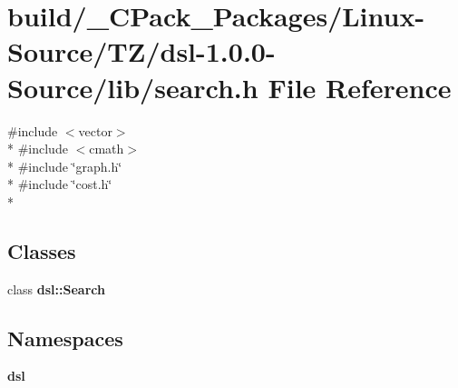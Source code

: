 \section{build/\-\_\-\-C\-Pack\-\_\-\-Packages/\-Linux-\/\-Source/\-T\-Z/dsl-\/1.0.0-\/\-Source/lib/search.h File Reference}
\label{build_2__CPack__Packages_2Linux-Source_2TZ_2dsl-1_80_80-Source_2lib_2search_8h}
{\ttfamily \#include $<$vector$>$}\\*
{\ttfamily \#include $<$cmath$>$}\\*
{\ttfamily \#include \char`\"{}graph.\-h\char`\"{}}\\*
{\ttfamily \#include \char`\"{}cost.\-h\char`\"{}}\\*
\subsection*{Classes}
\begin{DoxyCompactItemize}
\item 
class {\bf dsl\-::\-Search}
\end{DoxyCompactItemize}
\subsection*{Namespaces}
\begin{DoxyCompactItemize}
\item 
{\bf dsl}
\end{DoxyCompactItemize}
